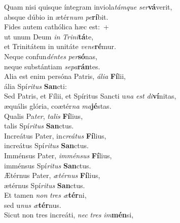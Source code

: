 \evenverse Quam nisi quisque íntegram inviola\textit{tám}\textit{que} \textit{ser}\textbf{vá}verit,~\*\\
\evenverse absque dúbio in ætér\textit{num} \textit{pe}\textbf{rí}bit.\\
\oddverse Fides autem cathólica hæc est:~+\\
\oddverse  ut unum Deum \textit{in} \textit{Tri}\textit{ni}\textbf{tá}te,~\*\\
\oddverse et Trinitátem in unitáte \textit{ve}\textit{ne}\textbf{ré}mur.\\
\evenverse Neque confun\textit{dén}\textit{tes} \textit{per}\textbf{só}nas,~\*\\
\evenverse neque substántiam \textit{se}\textit{pa}\textbf{rán}tes.\\
\oddverse Alia est enim persóna Patris, \textit{á}\textit{li}\textit{a} \textbf{Fí}lii,~\*\\
\oddverse ália Spí\textit{ri}\textit{tus} \textbf{San}cti:\\
\evenverse Sed Patris, et Fílii, et Spíritus Sancti u\textit{na} \textit{est} \textit{di}\textbf{ví}nitas,~\*\\
\evenverse æquális glória, coætér\textit{na} \textit{ma}\textbf{jé}stas.\\
\oddverse Qualis Pa\textit{ter}, \textit{ta}\textit{lis} \textbf{Fí}lius,~\*\\
\oddverse talis Spí\textit{ri}\textit{tus} \textbf{San}ctus.\\
\evenverse Increátus Pater, in\textit{cre}\textit{á}\textit{tus} \textbf{Fí}lius,~\*\\
\evenverse increátus Spí\textit{ri}\textit{tus} \textbf{San}ctus.\\
\oddverse Imménsus Pater, \textit{im}\textit{mén}\textit{sus} \textbf{Fí}lius,~\*\\
\oddverse imménsus Spí\textit{ri}\textit{tus} \textbf{San}ctus.\\
\evenverse Ætérnus Pater, \textit{æ}\textit{tér}\textit{nus} \textbf{Fí}lius,~\*\\
\evenverse ætérnus Spí\textit{ri}\textit{tus} \textbf{San}ctus.\\
\oddverse Et tamen \textit{non} \textit{tres} \textit{æ}\textbf{tér}ni,~\*\\
\oddverse sed u\textit{nus} \textit{æ}\textbf{tér}nus.\\
\evenverse Sicut non tres increáti, \textit{nec} \textit{tres} \textit{im}\textbf{mén}si,~\*\\
